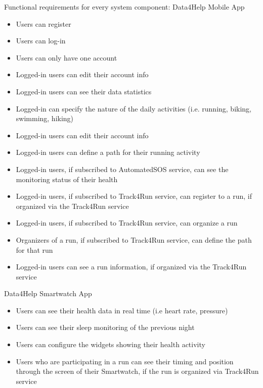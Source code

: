 Functional requirements for every system component:
\newline
Data4Help Mobile App
\begin{itemize}
    \item Users can register
    \item Users can log-in
    \item Users can only have one account
    \item Logged-in users can edit their account info
    \item Logged-in users can see their data statistics
    \item Logged-in can specify the nature of the daily activities (i.e. running, biking, swimming, hiking)
    \item Logged-in users can edit their account info
    \item Logged-in users can define a path for their running activity
    \item Logged-in users, if subscribed to AutomatedSOS service, can see the monitoring status of their health
    \item Logged-in users, if subscribed to Track4Run service, can register to a run, if organized via the Track4Run service
    \item Logged-in users, if subscribed to Track4Run service, can organize a run
    \item Organizers of a run, if subscribed to Track4Run service, can define the path for that run
    \item Logged-in users can see a run information, if organized via the Track4Run service
\end{itemize}

\noindent Data4Help Smartwatch App
\begin{itemize}
    \item Users can see their health data in real time (i.e heart rate, pressure)
    \item Users can see their sleep monitoring of the previous night
    \item Users can configure the widgets showing their health activity
    \item Users who are participating in a run can see their timing and position through the screen of their Smartwatch, if the run is organized via Track4Run service
\end{itemize}

